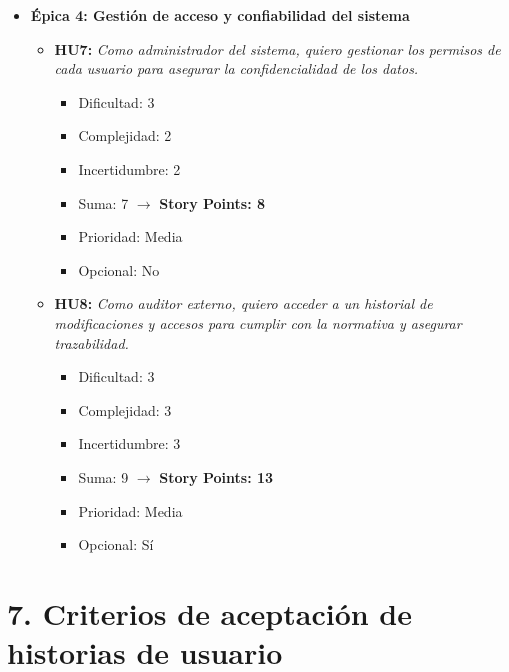 \documentclass[
11pt, %
]{ProyectoVpC}
\begin{document}
\begin{itemize}
  \item \textbf{\'{E}pica 4: Gestión de acceso y confiabilidad del sistema}
    \begin{itemize}
      \item \textbf{HU7:}
      \emph{Como administrador del sistema, quiero gestionar los permisos de cada usuario para asegurar la confidencialidad de los datos.}
        \begin{itemize}[label=$\cdot$]
          \item Dificultad: 3
          \item Complejidad: 2
          \item Incertidumbre: 2
          \item Suma: 7 $\rightarrow$ \textbf{Story Points: 8}
          \item Prioridad: Media
          \item Opcional: No
        \end{itemize}

      \item \textbf{HU8:}
      \emph{Como auditor externo, quiero acceder a un historial de modificaciones y accesos para cumplir con la normativa y asegurar trazabilidad.}
        \begin{itemize}[label=$\cdot$]
          \item Dificultad: 3
          \item Complejidad: 3
          \item Incertidumbre: 3
          \item Suma: 9 $\rightarrow$ \textbf{Story Points: 13}
          \item Prioridad: Media
          \item Opcional: Sí
        \end{itemize}
    \end{itemize}
\end{itemize}


\section{7. Criterios de aceptación de historias de usuario}
\label{sec:criteriosAceptacion}
\end{document}
